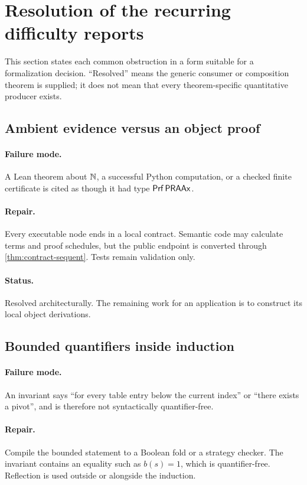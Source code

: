 \section{Resolution of the recurring difficulty reports}\label{sec:difficulties}

This section states each common obstruction in a form suitable for a formalization decision.  ``Resolved'' means the generic consumer or composition theorem is supplied; it does not mean that every theorem-specific quantitative producer exists.

\subsection{Ambient evidence versus an object proof}

\paragraph{Failure mode.}
A Lean theorem about \(\mathbb N\), a successful Python computation, or a checked finite certificate is cited as though it had type \(\mathsf{Prf}\,\mathsf{PRAAx}\).

\paragraph{Repair.}
Every executable node ends in a local contract.  Semantic code may calculate terms and proof schedules, but the public endpoint is converted through \cref{thm:contract-sequent}.  Tests remain validation only.

\paragraph{Status.}
Resolved architecturally.  The remaining work for an application is to construct its local object derivations.

\subsection{Bounded quantifiers inside induction}

\paragraph{Failure mode.}
An invariant says ``for every table entry below the current index'' or ``there exists a pivot'', and is therefore not syntactically quantifier-free.

\paragraph{Repair.}
Compile the bounded statement to a Boolean fold or a strategy checker.  The invariant contains an equality such as \(b(s)=1\), which is quantifier-free.  Reflection is used outside or alongside the induction.

